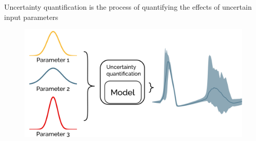 \documentclass[presentation]{beamer}
\begin{document}

\begin{frame}{Uncertainty quantification is the process of quantifying the effects of
              uncertain input parameters}
  \begin{figure}
    \includegraphics[width=1\textwidth]{probabalistic.png}
  \end{figure}

\end{frame}
\end{document}
